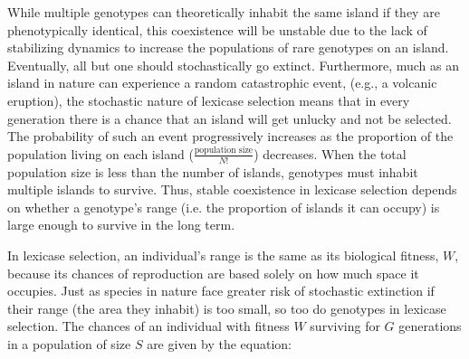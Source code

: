 

While %
multiple genotypes
can theoretically inhabit the same island
if they are phenotypically identical,
this coexistence will be unstable due to the lack of stabilizing dynamics to increase the populations of rare genotypes
on an island.
Eventually, all but one should stochastically go extinct. Furthermore, much as an island in nature can
experience a random catastrophic event, (e.g., a volcanic eruption), the stochastic nature of lexicase selection means that in every generation there is a chance that an island will get unlucky and not be selected. The probability of such an event progressively increases as the proportion of the population living on each island ($\frac{\text{population size}}{N!}$) decreases. %
When the total population size is %
less than the number of islands, %
genotypes must inhabit multiple islands to survive. Thus, stable coexistence in lexicase selection depends on whether a genotype's range (i.e. the proportion of islands it can occupy)
is large enough to survive in the long term.

In lexicase selection, an individual's range is the same as its biological fitness, $W$, because its chances of reproduction are based solely on how much space it occupies. Just as species in nature face greater risk of stochastic extinction if their range (the area they inhabit) is too small, so too do genotypes in lexicase selection. The chances of an individual with fitness $W$ surviving for $G$ generations in a population of size $S$ are given by the equation:


